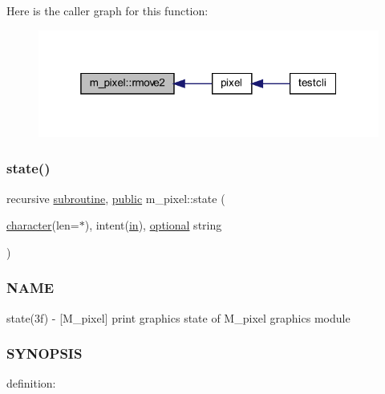 Here is the caller graph for this function\+:
\nopagebreak
\begin{figure}[H]
\begin{center}
\leavevmode
\includegraphics[width=319pt]{namespacem__pixel_a9b0fb9ccafe605fd6daf50c74347ed3a_icgraph}
\end{center}
\end{figure}
\mbox{\label{namespacem__pixel_aa24c465b23b0ddda341e97bc206fe249}} 
\subsubsection{\texorpdfstring{state()}{state()}}
{\footnotesize\ttfamily recursive \hyperlink{M__stopwatch_83_8txt_acfbcff50169d691ff02d4a123ed70482}{subroutine}, \hyperlink{M__stopwatch_83_8txt_a2f74811300c361e53b430611a7d1769f}{public} m\+\_\+pixel\+::state (\begin{DoxyParamCaption}\item[{\hyperlink{option__stopwatch_83_8txt_abd4b21fbbd175834027b5224bfe97e66}{character}(len=$\ast$), intent(\hyperlink{M__journal_83_8txt_afce72651d1eed785a2132bee863b2f38}{in}), \hyperlink{option__stopwatch_83_8txt_aa4ece75e7acf58a4843f70fe18c3ade5}{optional}}]{string }\end{DoxyParamCaption})}



\subsubsection*{N\+A\+ME}

state(3f) -\/ \mbox{[}M\+\_\+pixel\mbox{]} print graphics state of M\+\_\+pixel graphics module 

\subsubsection*{S\+Y\+N\+O\+P\+S\+IS}

definition\+:

